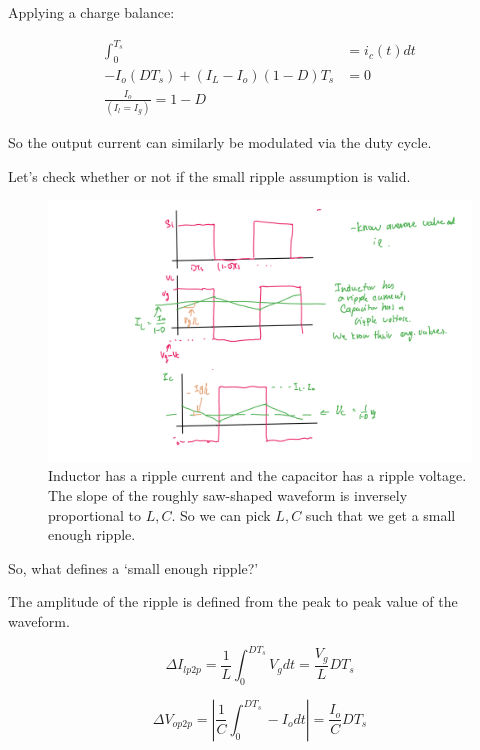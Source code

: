 \documentclass[../notes.tex]{subfiles}
\begin{document}
Applying a charge balance:


\begin{equation}
	\begin{split}
		 \int_{0}^{T_s}  &= i_c(t) dt  \\
										 -I_o (DT_s) + (I_L - I_o) (1-D)T_s &= 0  \\
										 \frac{I_o}{(I_l = I_g)} = 1-D
	\end{split}
\end{equation}

So the output current can similarly be modulated via the duty cycle.


Let's check whether or not if the small ripple assumption is valid.


\begin{figure}[H]
	\centering
	\includegraphics[width=0.8\linewidth]{img/image_2022-09-26-18-45-18.png}
	\caption{Inductor has a ripple current and the capacitor has a ripple voltage. The slope of the roughly saw-shaped waveform is inversely proportional to $ L, C $. So we can pick $ L, C$ such that we get a small enough ripple. }
\end{figure}


So, what defines a `small enough ripple?' 

The amplitude of the ripple is defined from the peak to peak value of the waveform.


\begin{equation}
	\Delta I_{l p2p} = \frac{1}{L} \int_{0}^{DT_s}  V_g dt = \frac{V_g}{L} D T_{s} 
\end{equation}

\begin{equation}
	\Delta V_{o p2p} = |\frac{1}{C} \int_{0}^{DT_s}  -I_o dt| = \frac{I_o}{C} D T_{s}
\end{equation}
\end{document}
